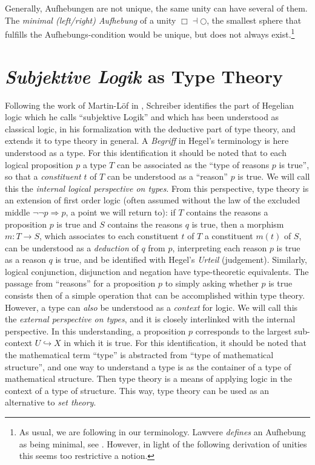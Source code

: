 \documentclass{article}
\begin{document}
Generally, Aufhebungen are not unique, the same unity can have several of them. The \emph{minimal (left/right)
Aufhebung} of a unity $\Box\dashv\bigcirc$, the smallest sphere that fulfills the Aufhebungs-condition
would be unique, but does not always exist.\footnote{As usual, we are following \cite{nlabsol} in our terminology.
Lawvere \emph{defines} an Aufhebung as being minimal, see \cite{Lawvere92}. However, in light of the following
derivation of unities this seems too restrictive a notion.}


\section{\emph{Subjektive Logik} as Type Theory}
Following the work of Martin-Löf in \cite{Loef96}, Schreiber identifies the part of Hegelian logic which
he calls ``subjektive Logik'' and which has been understood as classical logic, in his formalization with
the deductive part of type theory, and extends it to type theory in general. A \emph{Begriff} in Hegel's terminology is here understood
as a type. For this identification it should be noted that to each logical proposition $p$ a type $T$
can be associated as the ``type of reasons $p$ is true'', so that a \emph{constituent} $t$ of $T$ can be
understood as a ``reason'' $p$ is true. We will call this the \emph{internal logical perspective on types}.
From this perspective, type theory is an extension of first order logic
(often assumed without the law of the excluded middle $\neg\neg p \Rightarrow p$, a point we will return
to): if $T$ contains the reasons a proposition $p$ is true and $S$ contains the reasons $q$ is true, then
a morphism $m:T\rightarrow S$, which associates to each constituent $t$ of $T$ a constituent $m(t)$ of
$S$, can be understood as a \emph{deduction} of $q$ from $p$, interpreting each reason $p$ is true as a reason $q$ is true, and be identified with Hegel's \emph{Urteil}
(judgement). Similarly, logical conjunction, disjunction and negation have type-theoretic equivalents.
The passage from ``reasons'' for a proposition $p$ to simply asking whether $p$ is true consists then
of a simple operation that can be accomplished within type theory. \\

However, a type can \emph{also} be understood as a \emph{context} for logic. We will call this the 
\emph{external perspective on types}, and it is closely interlinked with the internal perspective. In this 
understanding, a
proposition $p$ corresponds to the largest sub-context $U\hookrightarrow X$ in which it is true. For this
identification, it should be noted that the mathematical term ``type'' is abstracted from ``type of 
mathematical
structure'', and one way to understand a type is as the container of a type of mathematical structure.
Then type theory is a means of applying logic in the context of a type of structure. This way, type theory
can be used as an alternative to \emph{set theory}. \\
\end{document}
